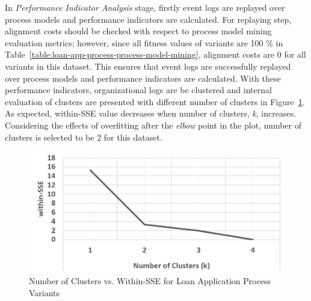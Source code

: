 In \textit{Performance Indicator Analysis} stage, firstly event logs are replayed over process models and performance indicators are calculated. For replaying step, alignment costs should be checked with respect to process model mining evaluation metrics; however, since all fitness values of variants are 100 \% in Table~\ref{table:loan-app-process-process-model-mining}, alignment costs are 0 for all variants in this dataset. This ensures that event logs are successfully replayed over process models and performance indicators are calculated. With these performance indicators, organizational logs are be clustered and internal evaluation of clusters are presented with different number of clusters in Figure~\ref{fig:loan-cluster-sse-plot}. As expected, within-SSE value decreases when number of clusters, \textit{k}, increases. Considering the effects of overfitting after the \textit{elbow} point in the plot, number of clusters is selected to be 2 for this dataset.
\begin{figure}
	\centering
	\includegraphics[width=\textwidth]{5_results_discussions/loan-application-process/cluster-sse-plot}
	\caption{Number of Clusters vs. Within-SSE for Loan Application Process Variants}
  \label{fig:loan-cluster-sse-plot}
\end{figure}

